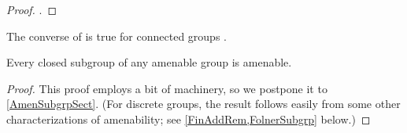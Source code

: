 \begin{proof}
.
\end{proof}

The converse of  is true for connected groups .

\begin{prop} \label{SubgrpAmen}
Every closed subgroup of any amenable group is amenable.
\end{prop}

\begin{proof}
This proof employs a bit of machinery, so we postpone it to \cref{AmenSubgrpSect}. 
(For discrete groups, the result follows easily from some other characterizations of amenability; see \cref{FinAddRem,FolnerSubgrp} below.)
\end{proof}




